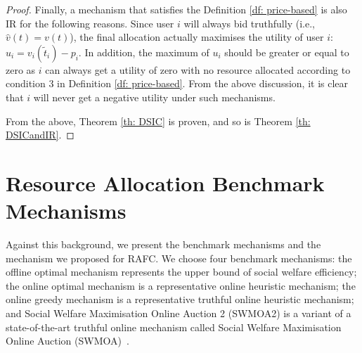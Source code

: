 \documentclass[11pt]{phdthesis}
\begin{document}
\begin{proof}
    Finally, a mechanism that satisfies the Definition \ref{df: price-based} is also IR for the following reasons. Since user $ i $ will always bid truthfully (i.e., $ \hat{v}(t) = v(t) $), the final allocation actually maximises the utility of user $i$: $ u_i = v_i(\tilde{t}_i)-p_i$. In addition, the maximum of $ u_i $ should be greater or equal to zero as $i$ can always get a utility of zero with no resource allocated according to condition 3 in Definition \ref{df: price-based}. From the above discussion, it is clear that $i$ will never get a negative utility under such mechanisms.
    
    From the above, Theorem \ref{th: DSIC} is proven, and so is Theorem \ref{th: DSICandIR}.
\end{proof}

\section{Resource Allocation Benchmark Mechanisms} \label{benchmarks}


Against this background, we present the benchmark mechanisms and the mechanism we proposed for RAFC. We choose four benchmark mechanisms: the offline optimal mechanism represents the upper bound of social welfare efficiency; the online optimal mechanism is a representative online heuristic mechanism; the online greedy mechanism is a representative truthful online heuristic mechanism; and Social Welfare Maximisation Online Auction 2 (SWMOA2) is a variant of a state-of-the-art truthful online mechanism called Social Welfare Maximisation Online Auction (SWMOA)~\citep{shi2017online}. 
\end{document}
